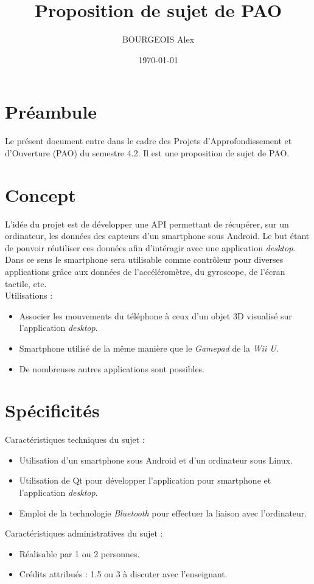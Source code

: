 \documentclass[a4paper,12pt]{article}
\title{\textbf{Proposition de sujet de PAO}}
\author{BOURGEOIS Alex}
\date \today
\begin{document}
\maketitle

\section{Préambule}
Le présent document entre dans le cadre des Projets d'Approfondissement et d'Ouverture (PAO) du semestre 4.2. Il est une proposition de sujet de PAO.

\section{Concept}
L'idée du projet est de développer une API permettant de récupérer, sur un ordinateur, les données des capteurs d'un smartphone sous Android. Le but étant de pouvoir réutiliser ces données afin d'intéragir avec une application \textit{desktop}. Dans ce sens le smartphone sera utilisable comme contrôleur pour diverses applications grâce aux données de l'accéléromètre, du gyroscope, de l'écran tactile, etc.\vspace{0.5cm}\\ 
Utilisations : 
\begin{itemize}
\item Associer les mouvements du téléphone à ceux d'un objet 3D visualisé sur l'application \textit{desktop}.
\item Smartphone utilisé de la même manière que le \textit{Gamepad} de la \textit{Wii U}.
\item De nombreuses autres applications sont possibles.
\end{itemize}

\section{Spécificités}

Caractéristiques techniques du sujet :
\begin{itemize}
\item Utilisation d'un smartphone sous Android et d'un ordinateur sous Linux.
\item Utilisation de Qt pour développer l'application pour smartphone et l'application \textit{desktop}.
\item Emploi de la technologie \textit{Bluetooth} pour effectuer la liaison avec l'ordinateur.
\end{itemize}
\vspace{0.5cm}

Caractéristiques administratives du sujet :
\begin{itemize}
\item Réalisable par 1 ou 2 personnes.
\item Crédits attribués : 1.5 ou 3 à discuter avec l'enseignant.
\end{itemize}
\end{document}
